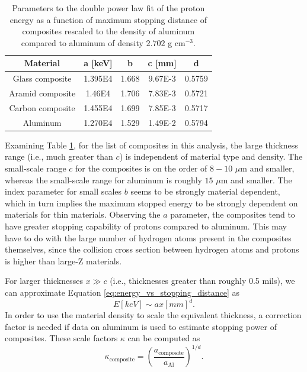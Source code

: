 \documentclass{hitec}
\begin{document}
\begin{table}[h]\centering
	\caption{Parameters to the double power law fit of the proton energy as a function of maximum stopping distance of composites rescaled to the density of aluminum compared to aluminum of density $2.702$ g cm$^{-3}$.}\label{tab:stopping_distance_rescaled}
	\begin{tabular}{|c | c | c | c | c |}\hline
		Material & a [keV] & b & c [mm] & d \\\hline
		Glass composite  & 1.395E4 & 1.668 & 9.67E-3 & 0.5759 \\\hline
		Aramid composite & 1.46E4  & 1.706 & 7.83E-3 & 0.5721  \\\hline
		Carbon composite & 1.455E4 & 1.699 & 7.85E-3 & 0.5717 \\\hline
		Aluminum         & 1.270E4 & 1.529 & 1.49E-2 & 0.5794 \\\hline
	\end{tabular}
\end{table}

Examining Table \ref{tab:stopping_distance_rescaled}, for the list of composites in this analysis, the large thickness range (i.e., much greater than $c$) is independent of material type and density. The small-scale range $c$ for the composites is on the order of $8-10$ $\mu$m and smaller, whereas the small-scale range for aluminum is roughly $15$ $\mu$m and smaller. The index parameter for small scales $b$ seems to be strongly material dependent, which in turn implies the maximum stopped energy to be strongly dependent on materials for thin materials. Observing the $a$ parameter, the composites tend to have greater stopping capability of protons compared to aluminum. This may have to do with the large number of hydrogen atoms present in the composites themselves, since the collision cross section between hydrogen atoms and protons is higher than large-Z materials.

For larger thicknesses $x \gg c$ (i.e., thicknesses greater than roughly 0.5 mils), we can approximate Equation \ref{eq:energy_vs_stopping_distance} as
\begin{equation}\label{eq:energy_vs_stopping_distance-large_dist}
E[keV] \sim a x[mm]^d.
\end{equation}
In order to use the material density to scale the equivalent thickness, a correction factor is needed if data on aluminum is used to estimate stopping power of composites. These scale factors $\kappa$ can be computed as
\begin{equation}
\kappa_{\text{composite}} = \left(\frac{a_{\text{composite}}}{a_{\text{Al}}}\right)^{1/d}.
\end{equation} 
\end{document}
